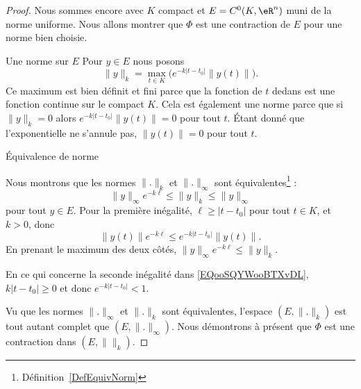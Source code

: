 \begin{proof}
    Nous sommes encore avec \( K\) compact et \( E=C^0(K,\eR^n)\) muni de la norme uniforme. Nous allons montrer que \( \Phi\) est une contraction de \( E\) pour une norme bien choisie.

    \begin{subproof}
        \item[Une norme sur \( E\)]
            Pour \( y\in E\) nous posons
            \begin{equation}
                \| y \|_k=\max_{t\in K}\big(  e^{-k| t-t_0 |}\| y(t) \| \big).
            \end{equation}
            Ce maximum est bien définit et fini parce que la fonction de \( t\) dedans est une fonction continue sur le compact \( K\). Cela est également une norme parce que si \( \| y \|_k=0\) alors \(  e^{-k| t-t_0 |}\| y(t) \|=0\) pour tout \( t\). Étant donné que l'exponentielle ne s'annule pas, \( \| y(t) \|=0\) pour tout \( t\).
        \item[Équivalence de norme]

            Nous montrons que les normes \( \| . \|_k\) et \( \| . \|_{\infty}\) sont équivalentes\footnote{Définition~\ref{DefEquivNorm}} :
            \begin{equation}        \label{EQooSQYWooBTXvDL}
                \| y \|_{\infty} e^{-k\ell}\leq \| y \|_k\leq \| y \|_{\infty}
            \end{equation}
            pour tout \( y\in E\). Pour la première inégalité, \( \ell\geq | t-t_0 |\) pour tout \( t\in K\), et \( k>0\), donc
            \begin{equation}
                \| y(t) \| e^{-k\ell}\leq  e^{-k| t-t_0 |}\| y(t) \|.
            \end{equation}
            En prenant le maximum des deux côtés, \( \| y \|_{\infty} e^{-k\ell}\leq \| y \|_k\).

            En ce qui concerne la seconde inégalité dans \eqref{EQooSQYWooBTXvDL}, \( k| t-t_0 |\geq 0\) et donc \(  e^{-k| t-t_0 |}<1\).

    \end{subproof}
    Vu que les normes \( \| . \|_{\infty}\) et \( \| . \|_k\) sont équivalentes, l'espace \( (E,\| . \|_k)\) est tout autant complet que \( (E,\| . \|_{\infty})\). Nous démontrons à présent que \( \Phi\) est une contraction dans \( (E,\|  \|_k)\).


\end{proof}
